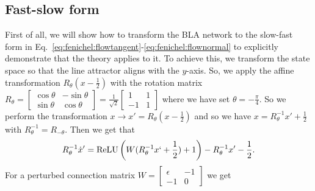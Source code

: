 \documentclass{article} %
\newcounter{ct}
\theoremstyle{definition}
\theoremstyle{remark}
\begin{document}
\subsection{Fast-slow form}\label{sec:supp:fast_slow_form}
First of all, we will show how to transform the BLA network to the slow-fast form in Eq.~\ref{eq:fenichel:flowtangent}-\ref{eq:fenichel:flownormal} to explicitly demonstrate that the theory applies to it.
To achieve this, we transform the state space so that the line attractor aligns with the \(y\)-axis.
So, we apply the affine transformation \(R_\theta(x-\frac{1}{2})\) with the rotation matrix \(R_\theta = \begin{bmatrix}\cos\theta &-\sin\theta\\\sin\theta&\cos\theta\end{bmatrix}= \frac{1}{\sqrt{2}}\begin{bmatrix}1 &1\\-1&1\end{bmatrix}\) where we have set \(\theta=-\frac{\pi}{4}\).
So we perform the transformation \(x\rightarrow x'= R_\theta(x-\frac{1}{2})\) and so we have \(x=R^{-1}_\theta x'+\frac{1}{2}\) with \(R^{-1}_\theta = R_{-\theta}\).
Then we get that
\begin{align}
R_{\theta}^{-1}\dot x' = \operatorname{ReLU}\left(W(R^{-1}_\theta x`+\frac{1}{2})+1\right)-R^{-1}_\theta x'-\frac{1}{2}.
\end{align}
For a perturbed connection matrix \(W=\begin{bmatrix}\epsilon &-1\\-1&0\end{bmatrix}\) we get
\end{document}
